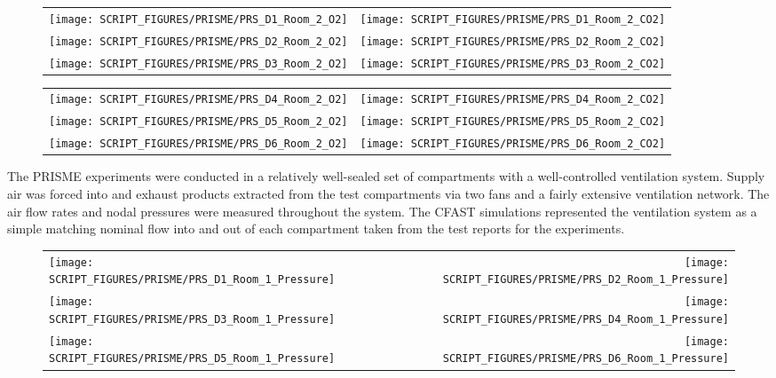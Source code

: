 \begin{figure}[p]
\begin{tabular*}{\textwidth}{l@{\extracolsep{\fill}}r}
\texttt{[image: SCRIPT\_FIGURES/PRISME/PRS\_D1\_Room\_2\_O2]} &
\texttt{[image: SCRIPT\_FIGURES/PRISME/PRS\_D1\_Room\_2\_CO2]} \\
\texttt{[image: SCRIPT\_FIGURES/PRISME/PRS\_D2\_Room\_2\_O2]} &
\texttt{[image: SCRIPT\_FIGURES/PRISME/PRS\_D2\_Room\_2\_CO2]} \\
\texttt{[image: SCRIPT\_FIGURES/PRISME/PRS\_D3\_Room\_2\_O2]} &
\texttt{[image: SCRIPT\_FIGURES/PRISME/PRS\_D3\_Room\_2\_CO2]}
\end{tabular*}
\label{PRISME_Gas_3}
\end{figure}

\begin{figure}[p]
\begin{tabular*}{\textwidth}{l@{\extracolsep{\fill}}r}
\texttt{[image: SCRIPT\_FIGURES/PRISME/PRS\_D4\_Room\_2\_O2]} &
\texttt{[image: SCRIPT\_FIGURES/PRISME/PRS\_D4\_Room\_2\_CO2]} \\
\texttt{[image: SCRIPT\_FIGURES/PRISME/PRS\_D5\_Room\_2\_O2]} &
\texttt{[image: SCRIPT\_FIGURES/PRISME/PRS\_D5\_Room\_2\_CO2]} \\
\texttt{[image: SCRIPT\_FIGURES/PRISME/PRS\_D6\_Room\_2\_O2]} &
\texttt{[image: SCRIPT\_FIGURES/PRISME/PRS\_D6\_Room\_2\_CO2]}
\end{tabular*}
\label{PRISME_Gas_4}
\end{figure}

\clearpage

The PRISME experiments were conducted in a relatively well-sealed set of compartments with a well-controlled ventilation system. Supply air was forced into and exhaust products extracted from the test compartments via two fans and a fairly extensive ventilation network. The air flow rates and nodal pressures were measured throughout the system. The CFAST simulations represented the ventilation system as a simple matching nominal flow into and out of each compartment taken from the test reports for the experiments.

\begin{figure}[!ht]
\begin{tabular*}{\textwidth}{l@{\extracolsep{\fill}}r}
\texttt{[image: SCRIPT\_FIGURES/PRISME/PRS\_D1\_Room\_1\_Pressure]} &
\texttt{[image: SCRIPT\_FIGURES/PRISME/PRS\_D2\_Room\_1\_Pressure]} \\
\texttt{[image: SCRIPT\_FIGURES/PRISME/PRS\_D3\_Room\_1\_Pressure]} &
\texttt{[image: SCRIPT\_FIGURES/PRISME/PRS\_D4\_Room\_1\_Pressure]} \\
\texttt{[image: SCRIPT\_FIGURES/PRISME/PRS\_D5\_Room\_1\_Pressure]} &
\texttt{[image: SCRIPT\_FIGURES/PRISME/PRS\_D6\_Room\_1\_Pressure]}
\end{tabular*}
\label{PRISME_Room_1_Pressures}
\end{figure}

